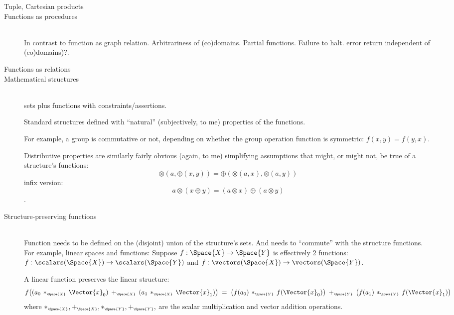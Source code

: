 \documentclass[11pt]{book}
\begin{document}
\begin{description}
\item[Tuple, Cartesian products]%

\item[Functions as procedures]\mbox{}\\
In contrast to function as graph relation.
Arbitrariness of (co)domains. Partial functions. Failure to halt.
error return independent of (co)domains)?.

\item[Functions as relations]%

\item[Mathematical structures]\mbox{}\\
sets plus functions with constraints/assertions.
\par
Standard structures defined with ``natural'' (subjectively, to me)
properties of the functions. 
\par
For example, a group is commutative or not, depending on whether
the group operation function is symmetric: $f(x,y) = f(y,x)$.
\par
Distributive properties are similarly fairly obvious
(again, to me)
simplifying assumptions that might, or might not, be true of
a structure's functions: 
\[
\otimes (a,\oplus (x,y)) = \oplus (\otimes (a,x), \otimes (a,y))
\]
infix version: 
\[
a \otimes (x \oplus y) = (a \otimes x) \oplus (a \otimes y)
\].

\item[Structure-preserving functions]\mbox{}\\
Function needs to be defined on the (disjoint) union of the 
structure's sets.
And needs to ``commute'' with the structure functions.
For example, linear spaces and functions: 
Suppose $f : \Space{X} \rightarrow \Space{Y}$
is effectively $2$ functions:
$f : \scalars(\Space{X}) \rightarrow \scalars(\Space{Y})$ and
$f : \vectors(\Space{X}) \rightarrow \vectors(\Space{Y})$.
 
A linear function preserves the linear structure:
\begin{equation*}
f \big( (a_0 \, *_{\scriptscriptstyle\Space{X}} \, \Vector{x}_0) 
\: +_{\scriptscriptstyle\Space{X}} \: 
(a_1 \, *_{\scriptscriptstyle\Space{X}} \, \Vector{x}_1) \big)
\; = \; 
\big( f(a_0) \, *_{\scriptscriptstyle\Space{Y}} \, f(\Vector{x}_0) \big) 
\: +_{\scriptscriptstyle\Space{Y}} \: 
\big( f(a_1) \, *_{\scriptscriptstyle\Space{Y}} \, f(\Vector{x}_1) \big)
\end{equation*}
where $*_{\scriptscriptstyle\Space{X}}, +_{\scriptscriptstyle\Space{X}}, 
*_{\scriptscriptstyle\Space{Y}}, +_{\scriptscriptstyle\Space{Y}},$
are the scalar multiplication and vector addition operations.
\end{description}
\end{document}
